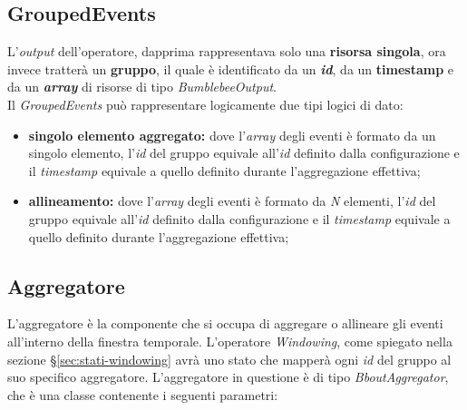 \subsection{GroupedEvents}\label{sec:ge}
L'\textit{output} dell'operatore, dapprima rappresentava solo una \textbf{risorsa singola}, ora invece tratterà un \textbf{gruppo}, il quale è identificato da un \textbf{\textit{id}}, da un \textbf{\gls{timestamp}} e da un \textbf{\textit{array}} di risorse di tipo \textit{BumblebeeOutput}.\\
Il \textit{GroupedEvents} può rappresentare logicamente due tipi logici di dato:
\begin{itemize}
	\item{\textbf{singolo elemento aggregato:} dove l'\textit{array} degli eventi è formato da un singolo elemento, l'\textit{id} del gruppo equivale all'\textit{id} definito dalla configurazione e il \textit{\gls{timestamp}} equivale a quello definito durante l'aggregazione effettiva;}
	\item{\textbf{allineamento:} dove l'\textit{array} degli eventi è formato da \textit{N} elementi, l'\textit{id} del gruppo equivale all'\textit{id} definito dalla configurazione e il \textit{\gls{timestamp}} equivale a quello definito durante l'aggregazione effettiva;}
\end{itemize}

\subsection{Aggregatore}\label{sec:aggregator}
L'aggregatore è la componente che si occupa di aggregare o allineare gli eventi all'interno della finestra temporale. L'operatore \textit{Windowing}, come spiegato nella sezione \S\ref{sec:stati-windowing} avrà uno stato che mapperà ogni \textit{id} del gruppo al suo specifico aggregatore. L'aggregatore in questione è di tipo \textit{BboutAggregator}, che è una classe contenente i seguenti parametri:

